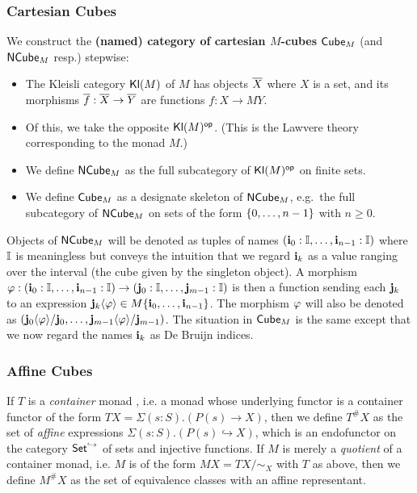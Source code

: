 \documentclass[a4paper]{article}
\begin{document}
\subsubsection{Cartesian Cubes}
\begin{definition}
	We construct the \textbf{(named) category of cartesian $M$-cubes} ${\mathsf{Cube}}_M$ (and ${\mathsf{NCube}}_M$ resp.) stepwise:
	\begin{itemize}
		\item The Kleisli category ${\mathsf{Kl}}(M)$ of $M$ has objects ${\overline{X}}$ where $X$ is a set, and its morphisms ${\overline{f}} : {\overline{X}} \to {\overline{Y}}$ are functions $f : X \to MY$.
		\item Of this, we take the opposite ${\mathsf{Kl}}(M)^{\mathsf{op}}$. (This is the Lawvere theory corresponding to the monad $M$.)
		\item We define ${\mathsf{NCube}}_M$ as the full subcategory of ${\mathsf{Kl}}(M)^{\mathsf{op}}$ on finite sets.
		\item We define ${\mathsf{Cube}}_M$ as a designate skeleton of ${\mathsf{NCube}}_M$, e.g.\ the full subcategory of ${\mathsf{NCube}}_M$ on sets of the form $\mathopen{}\left\{ 0, \ldots, n-1 \right\}\mathclose{}$ with $n \geq 0$.
	\end{itemize}
\end{definition}
Objects of ${\mathsf{NCube}}_M$ will be denoted as tuples of names $(\mathbf{i}_0 : {\mathbb I}, \ldots, \mathbf{i}_{n-1} : {\mathbb I})$ where ${\mathbb I}$ is meaningless but conveys the intuition that we regard $\mathbf{i}_k$ as a value ranging over the interval (the cube given by the singleton object).
A morphism $\varphi : (\mathbf{i}_0 : {\mathbb I}, \ldots, \mathbf{i}_{n-1} : {\mathbb I}) \to (\mathbf{j}_0 : {\mathbb I}, \ldots, \mathbf{j}_{m-1} : {\mathbb I})$ is then a function sending each $\mathbf{j}_k$ to an expression $\mathbf{j}_k \langle \varphi \rangle \in M\mathopen{}\left\{ \mathbf{i}_0, \ldots, \mathbf{i}_{n-1} \right\}\mathclose{}$.
The morphism $\varphi$ will also be denoted as $(\mathbf{j}_0 \langle \varphi \rangle / \mathbf{j}_0, \ldots, \mathbf{j}_{m-1} \langle \varphi \rangle / \mathbf{j}_{m-1})$.
The situation in ${\mathsf{Cube}}_M$ is the same except that we now regard the names $\mathbf{i}_k$ as De Bruijn indices.

\subsubsection{Affine Cubes}
If $T$ is a \emph{container} monad \cite{container-combinatorics}, i.e. a monad whose underlying functor is a container functor \cite{containers} of the form $TX = \Sigma(s : S).(P(s) \to X)$, then we define $T^\# X$ as the set of \emph{affine} expressions $\Sigma(s : S).(P(s) \hookrightarrow X)$, which is an endofunctor on the category ${\mathsf{Set}}^{\hookrightarrow}$ of sets and injective functions.
If $M$ is merely a \emph{quotient} of a container monad, i.e. $M$ is of the form $MX = TX/\sim_X$ with $T$ as above, then we define $M^\# X$ as the set of equivalence classes with an affine representant.
\end{document}
